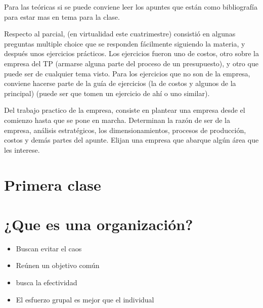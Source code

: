 \documentclass[titlepage,a4paper]{article}
\begin{document}
Para las teóricas si se puede conviene leer los apuntes que están como bibliografía para estar mas en tema para la clase.

Respecto al parcial, (en virtualidad este cuatrimestre) consistió en algunas preguntas multiple choice que se responden fácilmente siguiendo la materia, y después unos ejercicios prácticos. Los ejercicios fueron uno de costos, otro sobre la empresa del TP (armarse alguna parte del proceso de un presupuesto), y otro que puede ser de cualquier tema visto. Para los ejercicios que no son de la empresa, conviene hacerse parte de la guía de ejercicios (la de costos y algunos de la principal) (puede ser que tomen un ejercicio de ahí o uno similar).

Del trabajo practico de la empresa, consiste en plantear una empresa desde el comienzo hasta que se pone en marcha. Determinan la razón de ser de la empresa, análisis estratégicos, los dimensionamientos, procesos de producción, costos y demás partes del apunte. Elijan una empresa que abarque algún área que les interese.

\newpage

\section*{Primera clase}







\section{¿Que es una organización?}
\begin{itemize}
    \item Buscan evitar el caos
    \item Reúnen un objetivo común
    \item busca la efectividad
    \item El esfuerzo grupal es mejor que el individual
\end{itemize}
\end{document}
